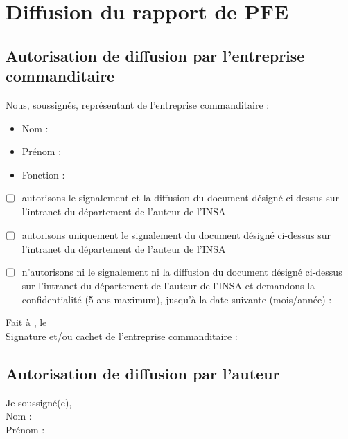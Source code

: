 \section*{Diffusion du rapport de PFE}
\subsection*{Autorisation de diffusion par l’entreprise commanditaire}
Nous, soussignés, représentant de l’entreprise commanditaire :  
\begin{itemize}[label={--}]
    \item Nom : \underline{\hspace{5cm}}
    \item Prénom : \underline{\hspace{5cm}}
    \item Fonction : \underline{\hspace{5cm}}
\end{itemize}

\begin{itemize}
    \item ☐ autorisons le signalement et la diffusion du document désigné ci-dessus sur l’intranet du département de l'auteur de l’INSA
    \item ☐ autorisons uniquement le signalement du document désigné ci-dessus sur l’intranet du département de l'auteur de l’INSA
    \item ☐ n’autorisons ni le signalement ni la diffusion du document désigné ci-dessus sur l’intranet du département de l'auteur de l’INSA et demandons la confidentialité (5 ans maximum), jusqu’à la date suivante (mois/année) : \underline{\hspace{3cm}}
\end{itemize}

Fait à \underline{\hspace{3cm}}, le \underline{\hspace{3cm}} \\
Signature et/ou cachet de l’entreprise commanditaire : \underline{\hspace{5cm}}

\subsection*{Autorisation de diffusion par l’auteur}
Je soussigné(e), \\
Nom : \underline{\hspace{5cm}} \\
Prénom : \underline{\hspace{5cm}}

